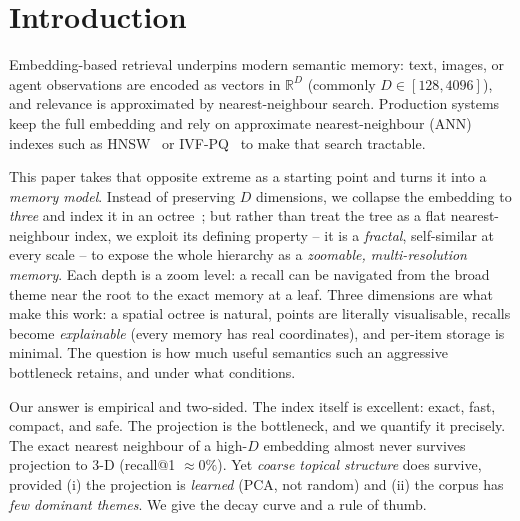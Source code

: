 \documentclass[11pt]{article}
\begin{document}
\section{Introduction}
Embedding-based retrieval underpins modern semantic memory: text, images, or
agent observations are encoded as vectors in $\mathbb{R}^D$ (commonly
$D\in[128,4096]$), and relevance is approximated by nearest-neighbour search.
Production systems keep the full embedding and rely on approximate
nearest-neighbour (ANN) indexes such as HNSW~\cite{hnsw} or
IVF-PQ~\cite{ivfpq,faiss} to make that search tractable.

This paper takes that opposite extreme as a starting point and turns it into a
\emph{memory model}. Instead of preserving $D$ dimensions, we collapse the
embedding to \emph{three} and index it in an octree~\cite{octreerag}; but rather
than treat the tree as a flat nearest-neighbour index, we exploit its defining
property -- it is a \emph{fractal}, self-similar at every scale -- to expose the
whole hierarchy as a \emph{zoomable, multi-resolution memory}. Each depth is a
zoom level: a recall can be navigated from the broad theme near the root to the
exact memory at a leaf. Three dimensions are what make this work: a spatial octree
is natural, points are literally visualisable, recalls become \emph{explainable}
(every memory has real coordinates), and per-item storage is minimal. The question
is how much useful semantics such an aggressive bottleneck retains, and under what
conditions.

Our answer is empirical and two-sided. The index itself is excellent: exact,
fast, compact, and safe. The projection is the bottleneck, and we quantify it
precisely. The exact nearest neighbour of a high-$D$ embedding almost never
survives projection to 3-D (recall@1 $\approx 0\%$). Yet \emph{coarse topical
structure} does survive, provided (i) the projection is \emph{learned} (PCA, not
random) and (ii) the corpus has \emph{few dominant themes}. We give the decay
curve and a rule of thumb.
\end{document}
